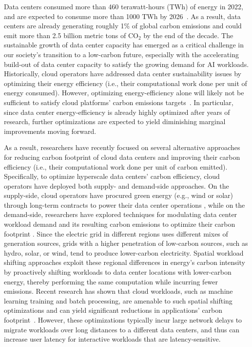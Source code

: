 Data centers consumed more than 460 terawatt-hours (TWh) of energy in 2022, and are expected to consume more than 1000 TWh by 2026~\cite{iea2024electricity}. As a result, data centers are already generating roughly 1\% of global carbon emissions and could emit more than 2.5 billion metric tons of $\text{CO}_2$ by the end of the decade. The sustainable growth of data center capacity has emerged as a critical challenge in our society's transition to a low-carbon future, especially with the accelerating build-out of data center capacity to satisfy the growing demand for AI workloads. Historically, cloud operators have addressed data center sustainability issues by optimizing their energy efficiency (i.e., their computational work done per unit of energy consumed).  However, optimizing energy-efficiency alone will likely not be sufficient to satisfy cloud platforms' carbon emissions targets~\cite{Bashir2022:HotAir}.  In particular, since data center energy-efficiency is already highly optimized after years of research, further optimizations are expected to yield diminishing marginal improvements moving forward. 


As a result, researchers have recently focused on several alternative approaches for reducing carbon footprint of cloud data centers and improving their carbon efficiency (i.e., their computational work done per unit of carbon emitted). Specifically, to optimize hyperscale data centers' carbon efficiency, cloud operators have deployed both supply- and demand-side approaches.  On the supply-side, cloud operators have procured green energy (e.g., wind or solar) through long-term contracts to power their data center operations \cite{google_offshore_wind_2024}, while on the demand-side, researchers have explored techniques for modulating data center workload demand and its resulting carbon emissions to optimize their carbon footprint \cite{wait-awhile}. Since the electric grid in different regions uses different mixes of generation sources, grids with a higher penetration of low-carbon sources, such as hydro, solar, or wind, tend to produce lower-carbon electricity. Spatial workload shifting approaches exploit these regional differences in energy's carbon intensity by proactively shifting workloads to data center locations with lower-carbon energy, thereby performing the same computation while incurring fewer emissions. Recent research has shown that cloud workloads, such as machine learning training and batch processing, are amenable to such spatial shifting optimizations and can yield significant reductions in applications' carbon footprint~\cite{sukprasert2024limitations, cloudcarbon, Gsteiger2024:Caribou, Murillo2024:CDNShifter}. However, these optimizations typically incur large network delays to migrate workloads over long distances to a different data centers, and thus can increase user latency for interactive workloads that are latency-sensitive.

